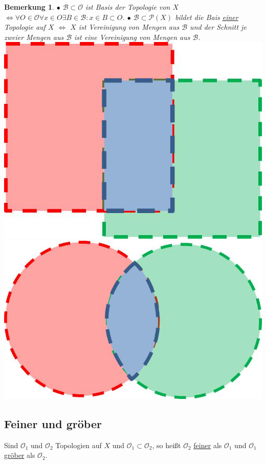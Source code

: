 \documentclass[a4paper,11pt,notitlepage]{report}
\newtheorem{remark}{Bemerkung}[chapter]
\newcommand{\OO}{{\ensuremath{\mathcal{O}}}}
\newenvironment{Kasten}[1]
{
\hspace{0.05\linewidth}
\begin{center}
\begin{minipage}{0.9\linewidth}
\setlength{\fboxsep}{10pt}
\definecolor{shadecolor}{gray}{1}
\definecolor{framecolor}{gray}{0}
\def\FrameCommand{\fcolorbox{framecolor}{shadecolor}}
\MakeFramed {\FrameRestore}
\subsection{#1}
\begin{itshape}
}
{
\end{itshape}
\endMakeFramed
\end{minipage}
\end{center}
}
\begin{document}
\begin{remark}
	$\bullet$ $\mathcal{B} \subset \OO$ ist Basis der Topologie von $X$ $\Leftrightarrow \forall O \in \OO \forall x \in O \exists B \in \mathcal{B} \colon x \in B \subset O$.
	\newline
	$\bullet$ $\mathcal{B} \subset \mathcal{P}(X)$ bildet die Bais \underline{einer} Topologie auf $X$ $\Leftrightarrow$ $X$ ist Vereinigung von Mengen aus $\mathcal{B}$ und der Schnitt je zweier Mengen aus $\mathcal{B}$ ist eine Vereinigung von Mengen aus $\mathcal{B}$.
	\newline
	\includegraphics[scale=0.3]{images/Quadrate_Schnitt.jpg}\qquad
	\includegraphics[scale=0.3]{images/Kreis_Schnitt.jpg}
\end{remark}

\begin{Kasten}{Feiner und gröber}
	Sind $\OO_1$ und $\OO_2$ Topologien auf $X$ und $\OO_1 \subset \OO_2$, so heißt $\OO_2$ \underline{feiner} als $\OO_1$ und $\OO_1$ \underline{gröber} als $\OO_2$.
\end{Kasten}
\end{document}
